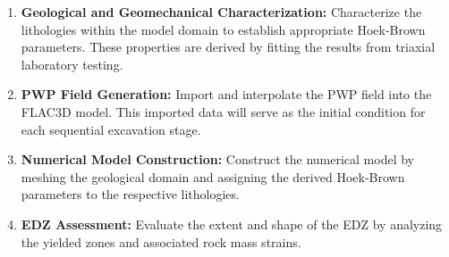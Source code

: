 \begin{enumerate}
\item \textbf{Geological and Geomechanical Characterization:} Characterize the lithologies within the model domain to establish appropriate Hoek-Brown parameters. These properties are derived by fitting the results from triaxial laboratory testing.
\item \textbf{\gls{PWP} Field Generation:} Import and interpolate the \gls{PWP} field into the FLAC3D model. This imported data will serve as the initial condition for each sequential excavation stage. 
\item \textbf{Numerical Model Construction:} Construct the numerical model by meshing the geological domain and assigning the derived Hoek-Brown parameters to the respective lithologies.
\item \textbf{EDZ Assessment:} Evaluate the extent and shape of the \gls{EDZ} by analyzing the yielded zones and associated rock mass strains.
\end{enumerate}


